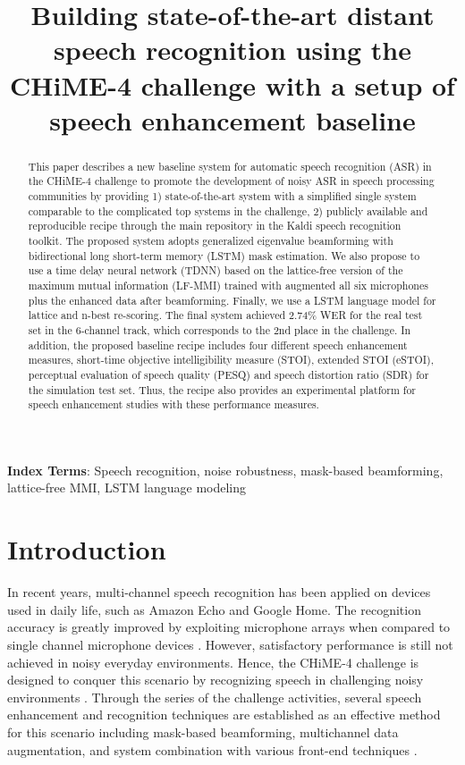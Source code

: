 \documentclass[a4paper]{article}
\title{Building state-of-the-art distant speech recognition using the CHiME-4 challenge with a setup of speech enhancement baseline}
\begin{document}
\maketitle 
\begin{abstract}
This paper describes a new baseline system for automatic speech recognition (ASR) in the CHiME-4 challenge to promote the development of noisy ASR in speech processing communities by providing 1) state-of-the-art system with a simplified single system comparable to the complicated top systems in the challenge, 2) publicly available and reproducible recipe through the main repository in the Kaldi speech recognition toolkit.
The proposed system adopts generalized eigenvalue beamforming with bidirectional long short-term memory (LSTM) mask estimation.
We also propose to use a time delay neural network (TDNN) based on the lattice-free version of the maximum mutual information (LF-MMI) trained with augmented all six microphones plus the enhanced data after beamforming.
Finally, we use a LSTM language model for lattice and n-best re-scoring. 
The final system achieved 2.74\% WER for the real test set in the 6-channel track, which corresponds to the 2nd place in the challenge.
In addition, the proposed baseline recipe includes four different speech enhancement measures, short-time objective intelligibility measure (STOI), extended STOI (eSTOI), perceptual evaluation of speech quality (PESQ) and speech distortion ratio (SDR) for the simulation test set. 
Thus, the recipe also provides an experimental platform for speech enhancement studies with these performance measures.

\end{abstract}
\noindent\textbf{Index Terms}: Speech recognition, noise robustness, mask-based beamforming, lattice-free MMI, LSTM language modeling

\section{Introduction}
\label{sec:intro}
In recent years, multi-channel speech recognition has been applied on devices used in daily life, such as Amazon Echo and Google Home. 
The recognition accuracy is greatly improved by exploiting microphone arrays when compared to single channel microphone devices \cite{barker2015third,kinoshita2016summary,li2017acoustic}. 
However, satisfactory performance is still not achieved in noisy everyday environments. 
Hence, the CHiME-4 challenge is designed to conquer this scenario by recognizing speech in challenging noisy environments \cite{vincent2017analysis}.
Through the series of the challenge activities, several speech enhancement and recognition techniques are established as an effective method for this scenario including mask-based beamforming, multichannel data augmentation, and system combination with various front-end techniques \cite{yoshioka2015ntt,du2016ustc,menne2016rwth,erdogan2016multi,fujita2016unsupervised}.
\end{document}
